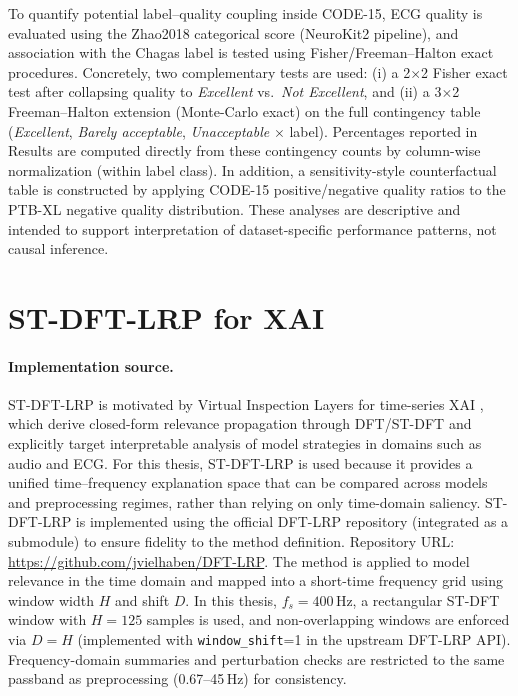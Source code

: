 To quantify potential label--quality coupling inside CODE-15, ECG quality is evaluated using the Zhao2018 categorical score (NeuroKit2 pipeline), and association with the Chagas label is tested using Fisher/Freeman--Halton exact procedures.
Concretely, two complementary tests are used: (i) a 2$\times$2 Fisher exact test after collapsing quality to \emph{Excellent} vs.\ \emph{Not Excellent}, and (ii) a 3$\times$2 Freeman--Halton extension (Monte-Carlo exact) on the full contingency table (\emph{Excellent}, \emph{Barely acceptable}, \emph{Unacceptable} $\times$ label).
Percentages reported in Results are computed directly from these contingency counts by column-wise normalization (within label class).
In addition, a sensitivity-style counterfactual table is constructed by applying CODE-15 positive/negative quality ratios to the PTB-XL negative quality distribution.
These analyses are descriptive and intended to support interpretation of dataset-specific performance patterns, not causal inference.

\section{ST-DFT-LRP for XAI}
\paragraph{Implementation source.}
ST-DFT-LRP is motivated by Virtual Inspection Layers for time-series XAI \parencite{VIELHABEN2024110309}, which derive closed-form relevance propagation through DFT/ST-DFT and explicitly target interpretable analysis of model strategies in domains such as audio and ECG.
For this thesis, ST-DFT-LRP is used because it provides a unified time--frequency explanation space that can be compared across models and preprocessing regimes, rather than relying on only time-domain saliency.
ST-DFT-LRP is implemented using the official DFT-LRP repository (integrated as a submodule) to ensure fidelity to the method definition.
Repository URL: \url{https://github.com/jvielhaben/DFT-LRP}.
The method is applied to model relevance in the time domain and mapped into a short-time frequency grid using window width $H$ and shift $D$.
In this thesis, $f_s=400$\,Hz, a rectangular ST-DFT window with $H=125$ samples is used, and non-overlapping windows are enforced via $D=H$ (implemented with \texttt{window\_shift}=1 in the upstream DFT-LRP API).
Frequency-domain summaries and perturbation checks are restricted to the same passband as preprocessing (0.67--45\,Hz) for consistency.

